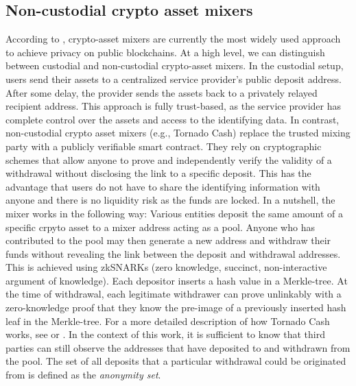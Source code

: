 \documentclass[12pt,a4paper,titlepage,oneside,english]{article}
\begin{document}
\subsection{Non-custodial crypto asset mixers}
According to \cite{nadler2023tornado}, crypto-asset mixers are currently the most widely used approach to achieve privacy on public blockchains. At a high level, we can distinguish between custodial and non-custodial crypto-asset mixers. \newline
In the custodial setup, users send their assets to a centralized service provider's public deposit address. After some delay, the provider sends the assets back to a privately relayed recipient address. This approach is fully trust-based, as the service provider has complete control over the assets and access to the identifying data. \newline 
In contrast, non-custodial crypto asset mixers (e.g., Tornado Cash) replace the trusted mixing party with a publicly verifiable smart contract. They rely on cryptographic schemes that allow anyone to prove and independently verify the validity of a withdrawal without disclosing the link to a specific deposit. This has the advantage that users do not have to share the identifying information with anyone and there is no liquidity risk as the funds are locked. \citep{nadler2023tornado} \newline
In a nutshell, the mixer works in the following way: Various entities deposit the same amount of a specific crpyto asset to a mixer address acting as a pool. Anyone who has contributed to the pool may then generate a new address and withdraw their funds without revealing the link between the deposit and withdrawal addresses. This is achieved using zkSNARKs (zero knowledge, succinct, non-interactive argument of knowledge). 
Each depositor inserts a hash value in a Merkle-tree. At the time of withdrawal, each legitimate withdrawer can prove unlinkably with a zero-knowledge proof that they know the pre-image of a previously inserted hash leaf in the Merkle-tree. %
 For a more detailed description of how Tornado Cash works, see \cite{nadler2023tornado} or \cite{Beres2020}. \newline
In the context of this work, it is sufficient to know that third parties can still observe the addresses that have deposited to and withdrawn from the pool. The set of all deposits that a particular withdrawal could be originated from is defined as the \textit{anonymity set}. 
\end{document}
